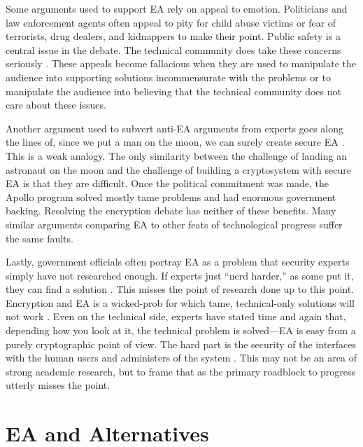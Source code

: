 Some arguments used to support \ac{EA} rely on appeal to emotion. Politicians and law enforcement agents often appeal to
pity for child abuse victims or fear of terrorists, drug dealers, and kidnappers to make their point. Public safety is a
central issue in the debate. The technical community does take these concerns seriously \cite{schneier_scaring_2019}.
These appeals become fallacious when they are used to manipulate the audience into supporting solutions incommensurate
with the problems or to manipulate the audience into believing that the technical community does not care about these
issues.

Another argument used to subvert anti-EA arguments from experts goes along the lines of, since we put a man on the moon,
we can surely create secure \ac{EA} \cite{cushing_moon_2018}. This is a weak analogy. The only similarity between the
challenge of landing an astronaut on the moon and the challenge of building a cryptosystem with secure EA is that they
are difficult. Once the political commitment was made, the Apollo program solved mostly tame problems and had enormous
government backing. Resolving the encryption debate has neither of these benefits. Many similar arguments comparing
\ac{EA} to other feats of technological progress suffer the same faults.

Lastly, government officials often portray \ac{EA} as a problem that security experts simply have not researched enough.
If experts just ``nerd harder,'' as some put it, they can find a solution \cite{schneier_2019}. This misses the point of
research done up to this point. Encryption and \ac{EA} is a \ac{wicked-prob} for which tame, technical-only solutions
will not work \cite{rozenshtein_wicked_2018}. Even on the technical side, experts have stated time and again that,
depending how you look at it, the technical problem is solved---\ac{EA} is easy from a purely cryptographic point of
view. The hard part is the security of the interfaces with the human users and administers of the system
\cite{abelson_risks_1997} \cite{abelson_2015}. This may not be an area of strong academic research, but to frame that
as the primary roadblock to progress utterly misses the point.


\section{EA and Alternatives}

